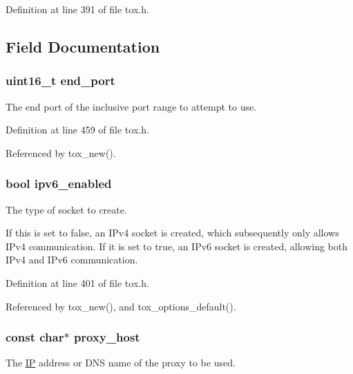 Definition at line 391 of file tox.\+h.



\subsection{Field Documentation}
\hypertarget{struct_tox___options_a72adaef23252363613b9ace5351ce521}{
\subsubsection[{end\+\_\+port}]{\setlength{\rightskip}{0pt plus 5cm}uint16\+\_\+t end\+\_\+port}}\label{struct_tox___options_a72adaef23252363613b9ace5351ce521}
The end port of the inclusive port range to attempt to use. 

Definition at line 459 of file tox.\+h.



Referenced by tox\+\_\+new().

\hypertarget{struct_tox___options_a320e68fce8ebf1b6f0bb10494d800441}{
\subsubsection[{ipv6\+\_\+enabled}]{\setlength{\rightskip}{0pt plus 5cm}bool ipv6\+\_\+enabled}}\label{struct_tox___options_a320e68fce8ebf1b6f0bb10494d800441}
The type of socket to create.

If this is set to false, an I\+Pv4 socket is created, which subsequently only allows I\+Pv4 communication. If it is set to true, an I\+Pv6 socket is created, allowing both I\+Pv4 and I\+Pv6 communication. 

Definition at line 401 of file tox.\+h.



Referenced by tox\+\_\+new(), and tox\+\_\+options\+\_\+default().

\hypertarget{struct_tox___options_af7c34966a1703e0a031ce2674420c7cf}{
\subsubsection[{proxy\+\_\+host}]{\setlength{\rightskip}{0pt plus 5cm}const char$\ast$ proxy\+\_\+host}}\label{struct_tox___options_af7c34966a1703e0a031ce2674420c7cf}
The \hyperlink{struct_i_p}{I\+P} address or D\+N\+S name of the proxy to be used.


